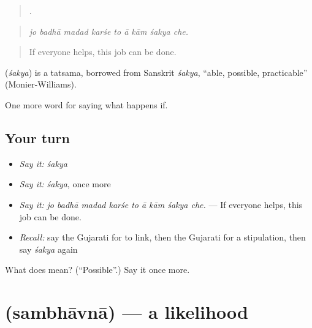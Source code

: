 \begin{quote}
        .
\end{quote}

\begin{quote}
\emph{jo badhā madad karśe to ā kām śakya che.}
\end{quote}

\begin{quote}
If everyone helps, this job can be done.
\end{quote}

\begin{cousinweb}
\textbf{} (\emph{śakya}) is a tatsama, borrowed from Sanskrit \emph{śakya}, \textquotedblleft{}able, possible, practicable\textquotedblright{} (Monier-Williams).
\end{cousinweb}

\begin{grammarlens}[title={What you've built}]
One more word for saying what happens if.
\end{grammarlens}

\subsection*{Your turn}
\begin{itemize}
\raggedright
  \item \emph{Say it:} \emph{śakya}
  \item \emph{Say it:} \emph{śakya}, once more
  \item \emph{Say it:} \emph{jo badhā madad karśe to ā kām śakya che.} — If everyone helps, this job can be done.
  \item \emph{Recall:} say the Gujarati for to link, then the Gujarati for a stipulation, then say \emph{śakya} again
\end{itemize}

\begin{tcolorbox}[breakable,colback=teal!4,colframe=teal!35!black,title={Before you move on}]
What does  mean? (\textquotedblleft{}Possible\textquotedblright{}.) Say it once more.
\end{tcolorbox}
\section[\texorpdfstring{\gu{સંભાવના} (sambhāvnā)}{સંભાવના (sambhāvnā)}]{ (sambhāvnā) — a likelihood}

\label{lesson:GU-C366-sambhavna}




